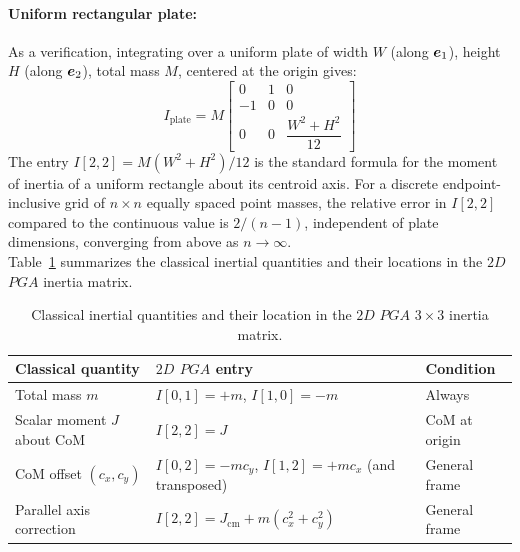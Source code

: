 \paragraph{Uniform rectangular plate:} As a verification, integrating over a uniform plate
of
width $W$ (along $\bm{e}_{1}$), height $H$ (along $\bm{e}_{2}$), total mass $M$, centered at the
origin gives:
\begin{equation}
    I_\mathrm{plate} = M
    \begin{bmatrix}
        0  &  1  &  0 \\
        -1 &  0  &  0 \\
        0  &  0  & \dfrac{W^2 + H^2}{12}
    \end{bmatrix}
    \label{eq:inertia_plate}
\end{equation}
The entry $I[2,2] = M(W^2+H^2)/12$ is the standard formula for the moment of inertia of a
uniform rectangle about its centroid axis. For a discrete endpoint-inclusive grid of $n
\times n$ equally spaced point masses, the relative error in $I[2,2]$ compared to the
continuous value is $2/(n-1)$, independent of plate dimensions, converging from above as
$n \to \infty$. \\

Table~\ref{tab:classical_pga2dp} summarizes the classical inertial quantities and their
locations in the $2D$ $PGA$ inertia matrix.

\begin{table}[h!]
\centering\small
\begin{tabular}{p{4cm}|p{5.5cm}|p{2.8cm}}
\hline
Classical quantity & $2D$ $PGA$ entry & Condition \\
\hline
Total mass $m$ & $I[0,1] = +m$,\; $I[1,0] = -m$ & Always \\
Scalar moment $J$ about CoM & $I[2,2] = J$ & CoM at origin \\
CoM offset $(c_x, c_y)$ & $I[0,2] = -mc_y$,\; $I[1,2] = +mc_x$ (and transposed) & General
frame \\
Parallel axis correction & $I[2,2] = J_\mathrm{cm} + m(c_x^2 + c_y^2)$ & General frame \\
\hline
\end{tabular}
\caption{Classical inertial quantities and their location in the $2D$ $PGA$ $3\times3$
inertia matrix.}
\label{tab:classical_pga2dp}
\end{table}


